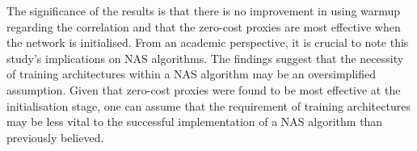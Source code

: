 The significance of the results is that there is no improvement in using warmup regarding the correlation and that the zero-cost proxies are most effective when the network is initialised. From an academic perspective, it is crucial to note this study's implications on \gls{NAS} algorithms. The findings suggest that the necessity of training architectures within a \gls{NAS} algorithm may be an oversimplified assumption. Given that zero-cost proxies were found to be most effective at the initialisation stage, one can assume that the requirement of training architectures may be less vital to the successful implementation of a \gls{NAS} algorithm than previously believed.

\begin{comment}
    
However, after analysing \autoref{fig:warmup} the authors find that using warm-up method doesn't improve the proxies, and only looking at initialisation is sufficient.  

In addition, these results expand on the discoveries from RQ1 and advance the study of \gls{GCN} \gls{NAS}. By determining the best point for each zero-cost proxy with a warm-up phase, which involves training for a specific number of epochs, one can stop the training process much sooner than previously. This approach improves accuracy prediction and reliability without compromising the performance assessment.
\end{comment}




